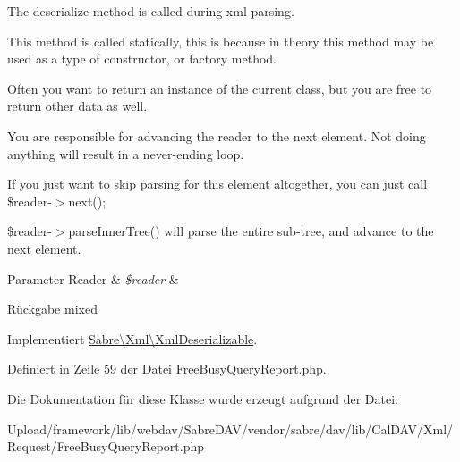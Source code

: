 The deserialize method is called during xml parsing.

This method is called statically, this is because in theory this method may be used as a type of constructor, or factory method.

Often you want to return an instance of the current class, but you are free to return other data as well.

You are responsible for advancing the reader to the next element. Not doing anything will result in a never-\/ending loop.

If you just want to skip parsing for this element altogether, you can just call \$reader-\/$>$next();

\$reader-\/$>$parse\+Inner\+Tree() will parse the entire sub-\/tree, and advance to the next element.


\begin{DoxyParams}[1]{Parameter}
Reader & {\em \$reader} & \\
\hline
\end{DoxyParams}
\begin{DoxyReturn}{Rückgabe}
mixed 
\end{DoxyReturn}


Implementiert \mbox{\hyperlink{interface_sabre_1_1_xml_1_1_xml_deserializable_a19e0eca545b9a0d93f7d6b69085ade30}{Sabre\textbackslash{}\+Xml\textbackslash{}\+Xml\+Deserializable}}.



Definiert in Zeile 59 der Datei Free\+Busy\+Query\+Report.\+php.



Die Dokumentation für diese Klasse wurde erzeugt aufgrund der Datei\+:\begin{DoxyCompactItemize}
\item 
Upload/framework/lib/webdav/\+Sabre\+D\+A\+V/vendor/sabre/dav/lib/\+Cal\+D\+A\+V/\+Xml/\+Request/Free\+Busy\+Query\+Report.\+php\end{DoxyCompactItemize}
